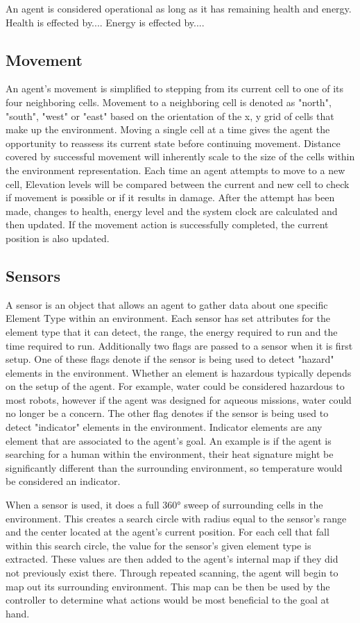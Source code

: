 An agent is considered operational as long as it has remaining health and energy.
Health is effected by....
Energy is effected by....

\subsection{Movement}
An agent's movement is simplified to stepping from its current cell to one of its four neighboring cells.
Movement to a neighboring cell is denoted as "north", "south", "west" or "east" based on the orientation of the x, y grid of cells that make up the environment.
Moving a single cell at a time gives the agent the opportunity to reassess its current state before continuing movement.
Distance covered by successful movement will inherently scale to the size of the cells within the environment representation.
Each time an agent attempts to move to a new cell, Elevation levels will be compared between the current and new cell to check if movement is possible or if it results in damage.
After the attempt has been made, changes to health, energy level and the system clock are calculated and then updated.
If the movement action is successfully completed, the current position is also updated.

\subsection{Sensors}
A sensor is an object that allows an agent to gather data about one specific Element Type within an environment.
Each sensor has set attributes for the element type that it can detect, the range, the energy required to run and the time required to run.
Additionally two flags are passed to a sensor when it is first setup.
One of these flags denote if the sensor is being used to detect "hazard" elements in the environment.
Whether an element is hazardous typically depends on the setup of the agent.
For example, water could be considered hazardous to most robots, however if the agent was designed for aqueous missions, water could no longer be a concern.
The other flag denotes if the sensor is being used to detect "indicator" elements in the environment.
Indicator elements are any element that are associated to the agent's goal.
An example is if the agent is searching for a human within the environment, their heat signature might be significantly different than the surrounding environment, so temperature would be considered an indicator.

When a sensor is used, it does a full 360° sweep of surrounding cells in the environment.
This creates a search circle with radius equal to the sensor's range and the center located at the agent's current position.
For each cell that fall within this search circle, the value for the sensor's given element type is extracted.
These values are then added to the agent's internal map if they did not previously exist there.
Through repeated scanning, the agent will begin to map out its surrounding environment.
This map can be then be used by the controller to determine what actions would be most beneficial to the goal at hand.

